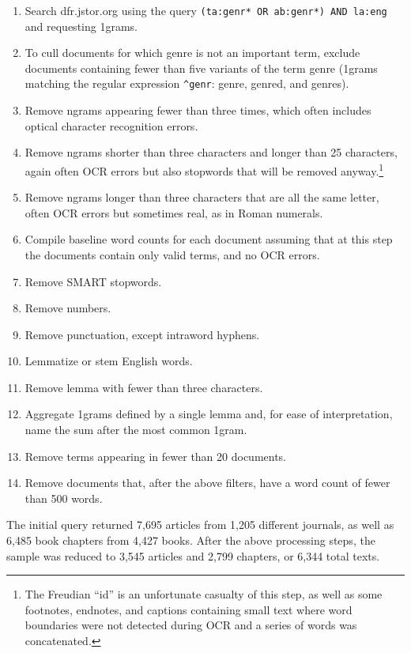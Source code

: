 \documentclass[]{book}
\providecommand{\tightlist}{%
  \setlength{\itemsep}{0pt}\setlength{\parskip}{0pt}}
\let\rmarkdownfootnote\footnote%
\def\footnote{\protect\rmarkdownfootnote}
\theoremstyle{definition}
\theoremstyle{definition}
\theoremstyle{definition}
\theoremstyle{remark}
\begin{document}
\begin{enumerate}
\def\labelenumi{\arabic{enumi}.}
\tightlist
\item
  Search dfr.jstor.org using the query
  \texttt{(ta:genr*\ OR\ ab:genr*)\ AND\ la:eng} and requesting 1grams.
\item
  To cull documents for which genre is not an important term, exclude
  documents containing fewer than five variants of the term genre
  (1grams matching the regular expression \texttt{\^{}genr}: genre,
  genred, and genres).
\item
  Remove ngrams appearing fewer than three times, which often includes
  optical character recognition errors.
\item
  Remove ngrams shorter than three characters and longer than 25
  characters, again often OCR errors but also stopwords that will be
  removed anyway.\footnote{The Freudian ``id'' is an unfortunate
    casualty of this step, as well as some footnotes, endnotes, and
    captions containing small text where word boundaries were not
    detected during OCR and a series of words was concatenated.}
\item
  Remove ngrams longer than three characters that are all the same
  letter, often OCR errors but sometimes real, as in Roman numerals.
\item
  Compile baseline word counts for each document assuming that at this
  step the documents contain only valid terms, and no OCR errors.
\item
  Remove SMART stopwords.
\item
  Remove numbers.
\item
  Remove punctuation, except intraword hyphens.
\item
  Lemmatize or stem English words.
\item
  Remove lemma with fewer than three characters.
\item
  Aggregate 1grams defined by a single lemma and, for ease of
  interpretation, name the sum after the most common 1gram.
\item
  Remove terms appearing in fewer than 20 documents.
\item
  Remove documents that, after the above filters, have a word count of
  fewer than 500 words.
\end{enumerate}

The initial query returned 7,695 articles from 1,205 different journals,
as well as 6,485 book chapters from 4,427 books. After the above
processing steps, the sample was reduced to 3,545 articles and 2,799
chapters, or 6,344 total texts.
\end{document}

